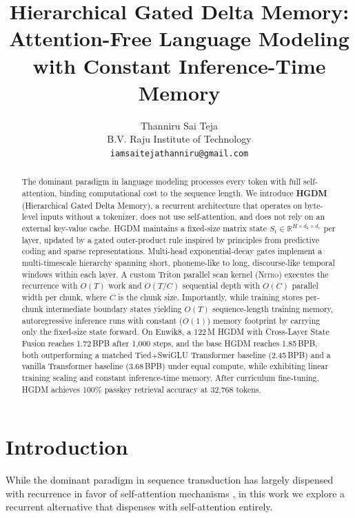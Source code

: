 \documentclass{article}
\title{
Hierarchical Gated Delta Memory:\\
Attention-Free Language Modeling with Constant Inference-Time Memory
}
\author{
  Thanniru Sai Teja \\
  B.V. Raju Institute of Technology \\
  \texttt{iamsaitejathanniru@gmail.com}
}
\newcommand{\R}{\mathbb{R}}
\begin{document}
\maketitle

\begin{abstract}
The dominant paradigm in language modeling processes every token with full
self-attention, binding computational cost to the sequence length. We
introduce \textbf{HGDM} (Hierarchical Gated Delta Memory), a recurrent
architecture that operates on byte-level inputs without a tokenizer, does not use
self-attention, and does not rely on an external key-value cache. HGDM
maintains a fixed-size matrix state $S_t \in \R^{H \times d_k \times d_v}$
per layer, updated by a gated outer-product rule inspired by principles from
predictive coding and sparse representations. Multi-head exponential-decay
gates implement a multi-timescale hierarchy spanning short, phoneme-like
to long, discourse-like temporal windows within each layer. A custom Triton
parallel scan kernel (\textsc{Nitro}) executes the recurrence with $O(T)$ work
and $O(T/C)$ sequential depth with $O(C)$ parallel width per chunk, where $C$
is the chunk size. Importantly, while training stores per-chunk intermediate
boundary states yielding $O(T)$ sequence-length training memory, autoregressive
inference runs with constant ($O(1)$) memory footprint by carrying only the
fixed-size state forward. On Enwik8, a 122\,M HGDM with Cross-Layer State Fusion
reaches 1.72\,BPB after 1{,}000 steps, and the base HGDM reaches 1.85\,BPB,
both outperforming a matched Tied+SwiGLU Transformer baseline (2.45\,BPB) and
a vanilla Transformer baseline (3.68\,BPB) under equal compute, while
exhibiting linear training scaling and constant inference-time memory. After curriculum fine-tuning, HGDM achieves 100\% passkey retrieval accuracy at 32{,}768 tokens.
\end{abstract}

\section{Introduction}
\label{sec:intro}

While the dominant paradigm in sequence transduction has largely dispensed with recurrence in favor of self-attention mechanisms \cite{vaswani2017attention}, in this work we explore a recurrent alternative that dispenses with self-attention entirely.
\end{document}

